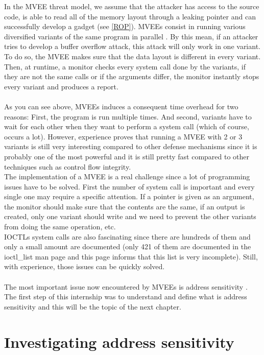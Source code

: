\documentclass[english]{enstaPRE}
\begin{document}
In the MVEE threat model, we assume that the attacker has access to the source code, is able to read all of the memory layout through a leaking pointer and 
can successfully develop a gadget (see \ref{ROP}).
MVEEs consist in running various diversified variants of the same program in parallel \cite{DBLP:conf/eurosys/SalamatJGF09}. By this mean, if an attacker tries to develop
a buffer overflow attack, this attack will only work in one variant. To do so, the MVEE makes sure that the data layout is 
different in every variant. Then, at runtime, a monitor checks every system call done by the variants, if they are not the same
calls or if the arguments differ, the monitor instantly stops every variant and produces a report. \\
 \\
As you can see above, MVEEs induces a consequent time overhead for two reasons: First, the program is run multiple times. And second,
variants have to wait for each other when they want to perform a system call (which of course, occurs a lot).
However, experience proves that running a MVEE with 2 or 3 variants is still very interesting compared to other defense mechanisms 
since it is probably one of the most powerful and it is still pretty fast compared to other techniques such as control flow integrity.
\\The implementation of a MVEE is a real challenge since a lot of programming issues have to be solved.
First the number of system call is important and every single one may require a specific attention. If a pointer is given as an argument,
the monitor should make sure that the contents are the same, if an output is created, only one variant should write and we need to 
prevent the other variants from doing the same operation, etc. \\ IOCTLs system calls are also fascinating since there are hundreds 
of them and only a small amount are documented (only 421 of them are documented in the ioctl\_list man page and this page informs 
that this list is very incomplete).  Still, with experience, those issues can be quickly solved.
\\ \\
The most important issue now encountered by MVEEs  is address sensitivity . The first step of this internship was to understand and 
define what is address sensitivity and this will be the topic of the next chapter.

\chapter{Investigating address sensitivity}
\end{document}
